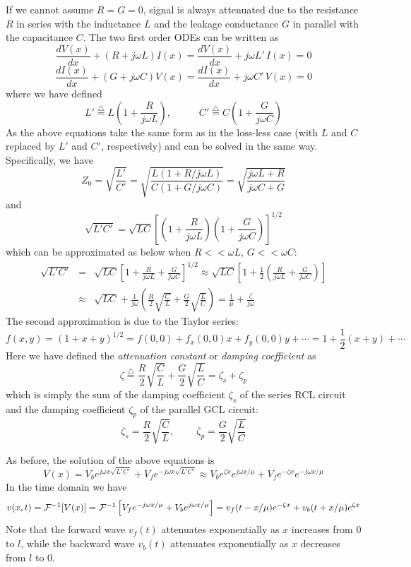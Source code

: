 If we cannot assume $R=G=0$, signal is always attenuated due to the
resistance $R$ in series with the inductance $L$ and the leakage
conductance $G$ in parallel with the capacitance $C$. The two first
order ODEs can be written as
\[ \frac{dV(x)}{dx}+(R+j\omega L)I(x)=\frac{dV(x)}{dx}+j\omega L'\,I(x)=0 \]
\[ \frac{dI(x)}{dx}+(G+j\omega C)V(x)=\frac{dI(x)}{dx}+j\omega C'\,V(x)=0 \]
where we have defined
\[	L'\stackrel{\triangle}{=}L\left(1+\frac{R}{j\omega L}\right),
\;\;\;\;\;\;\;\;\;\;
	C'\stackrel{\triangle}{=}C\left(1+\frac{G}{j\omega C}\right)	\]
As the above equations take the same form as in the loss-less case (with $L$ 
and $C$ replaced by $L'$ and $C'$, respectively) and can be solved in the same 
way. Specifically, we have
\[ Z_0=\sqrt{\frac{L'}{C'}}=\sqrt{\frac{L(1+R/j\omega L)}{C(1+G/j\omega C)}}
=\sqrt{\frac{j\omega L+R}{j\omega C+G}} \]
and
\[ \sqrt{L'C'}=\sqrt{LC}\left[ \left(1+\frac{R}{j\omega L}\right)
\left(1+\frac{G}{j\omega C}\right) \right]^{1/2} \]
which can be approximated as below when $R<<\omega L$, $G<<\omega C$:
\begin{eqnarray}
  \sqrt{L'C'}&=&\sqrt{LC}\left[ 1+\frac{R}{j\omega L}+\frac{G}{j\omega C}\right]^{1/2}
  \approx \sqrt{LC}\left[1+\frac{1}{2}\left(\frac{R}{j\omega L}+\frac{G}{j\omega C}\right)\right]
  \nonumber \\
  &\approx&\sqrt{LC}+\frac{1}{j\omega}\left( \frac{R}{2}\sqrt{\frac{C}{L}}+\frac{G}{2}\sqrt{\frac{L}{C}} \right)=\frac{1}{\mu}+\frac{\zeta }{j\omega}
  \nonumber 
\end{eqnarray}
The second approximation is due to the Taylor series:
\[ f(x,y)=(1+x+y)^{1/2}=f(0,0)+f_x(0,0)x+f_y(0,0)y+\cdots
=1+\frac{1}{2}(x+y)+\cdots \]
Here we have defined the {\em attenuation constant} or {\em damping coefficient} 
as
\[ \zeta\stackrel{\triangle}{=}\frac{R}{2}\sqrt{\frac{C}{L}}+
\frac{G}{2}\sqrt{\frac{L}{C}}=\zeta_s+\zeta_p
\]
which is simply the sum of the damping coefficient $\zeta_s$ of the
series RCL circuit and the damping coefficient $\zeta_p$ of the parallel
GCL circuit:
\[ \zeta_s=\frac{R}{2}\sqrt{\frac{C}{L}},\;\;\;\;\;\;\;\;
\zeta_p=\frac{G}{2}\sqrt{\frac{L}{C}} \]


As before, the solution of the above equations is
\[	V(x)=V_be^{j\omega x\sqrt{L'C'}}+V_fe^{-j\omega x\sqrt{L'C'}}
\approx V_be^{\zeta x}e^{j\omega x/\mu}+V_fe^{-\zeta x}e^{-j\omega x/\mu}
\]
In the time domain we have
\[  v(x,t)={\cal F}^{-1}[V(x)]={\cal F}^{-1}\left[V_f e^{-j\omega x/\mu}+V_b e^{j\omega x/\mu}\right]
=v_f(t-x/\mu)e^{-\zeta x}+v_b(t+x/\mu) e^{\zeta x}
\]
Note that the forward wave $v_f(t)$ attenuates exponentially as $x$ increases
from 0 to $l$, while the backward wave $v_b(t)$ attenuates exponentially as $x$ 
decreases from $l$ to 0.


